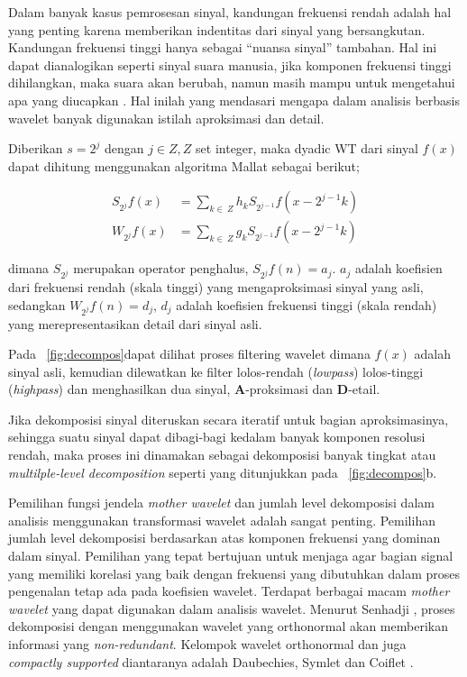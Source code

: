 Dalam banyak kasus pemrosesan sinyal, kandungan frekuensi rendah adalah hal yang
penting karena memberikan indentitas dari sinyal yang bersangkutan. Kandungan
frekuensi tinggi hanya sebagai ``nuansa sinyal'' tambahan. Hal ini dapat
dianalogikan seperti sinyal suara manusia, jika komponen frekuensi tinggi
dihilangkan, maka suara akan berubah, namun masih mampu untuk mengetahui apa
yang diucapkan \cite{wavelet:matlab}. Hal inilah yang mendasari mengapa dalam
analisis berbasis wavelet banyak digunakan istilah aproksimasi dan detail.

Diberikan $s = 2^j$ dengan $j \in Z, Z$ set integer, maka dyadic WT dari sinyal
$f(x)$  dapat dihitung menggunakan algoritma Mallat sebagai berikut;

\begin{align}
	\label{eq:sfn}
	S_{2^{j}}f(x) &= \sum_{k \in~Z} h_{k}S_{2^{j-1}}f(x - 2^{j-1}k) \\
	\label{eq:wfn}
	W_{2^{j}}f(x) &= \sum_{k \in~Z} g_{k}S_{2^{j-1}}f(x - 2^{j-1}k)
\end{align}

\noindent dimana $S_{2^{j}}$ merupakan operator penghalus, $S_{2^{j}} f(n) =
a_{j}$. $a_{j}$  adalah koefisien dari frekuensi rendah (skala tinggi) yang
mengaproksimasi sinyal yang asli, sedangkan $W_{2^{j}} f(n) = d_{j}$, $d_{j}$ 
adalah koefisien frekuensi tinggi (skala rendah) yang merepresentasikan detail
dari sinyal asli.


Pada \pic~\ref{fig:decompos}\footnotemark[\value{footnote}] dapat dilihat proses
filtering wavelet dimana $f(x)$ adalah sinyal asli, kemudian dilewatkan ke
filter lolos-rendah (\emph{lowpass})  lolos-tinggi (\emph{highpass}) dan
menghasilkan dua sinyal, \textbf{A}-proksimasi dan \textbf{D}-etail.


Jika dekomposisi sinyal diteruskan secara iteratif untuk bagian aproksimasinya,
sehingga suatu sinyal dapat dibagi-bagi kedalam banyak komponen resolusi rendah,
maka proses ini dinamakan sebagai dekomposisi banyak tingkat atau
\emph{multilple-level decomposition} seperti yang ditunjukkan pada
\pic~\ref{fig:decompos}b.
 
Pemilihan fungsi jendela \emph{mother wavelet} dan jumlah level dekomposisi
dalam analisis menggunakan transformasi wavelet adalah sangat penting.
Pemilihan jumlah level dekomposisi berdasarkan atas komponen frekuensi
yang dominan dalam sinyal. Pemilihan yang tepat bertujuan untuk menjaga agar
bagian signal yang memiliki korelasi yang baik dengan frekuensi yang dibutuhkan
dalam proses pengenalan tetap ada pada koefisien wavelet. Terdapat berbagai
macam \emph{mother wavelet} yang dapat digunakan dalam analisis wavelet. Menurut
Senhadji \cite{Senhadji:1995}, proses dekomposisi dengan menggunakan wavelet
yang orthonormal akan memberikan informasi yang \emph{non-redundant}. Kelompok
wavelet orthonormal dan juga \emph{compactly supported} diantaranya adalah
Daubechies, Symlet dan Coiflet \cite{Agfi:2006}.



